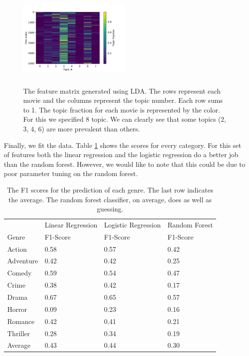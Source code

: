 \documentclass[11pt]{article}
\begin{document}
\begin{figure}[ht]
	\centering
		\includegraphics[width=0.5\textwidth,height=5cm]{lda_features.pdf}
	\caption{The feature matrix generated using LDA. The rows represent each movie and the columns represent the topic number. Each row sums to 1. The topic fraction for each movie is represented by the color. For this we specified 8 topic. We can clearly see that some topics (2, 3, 4, 6) are more prevalent than others.}
	\label{fig:lda}
\end{figure}

Finally, we fit the data. Table \ref{tab:lda_scores} shows the scores for every category. For this set of features both the linear regression and the logistic regression do a better job than the random forest. However, we would like to note that this could be due to poor parameter tuning on the random forest.

\begin{table}[h]
	\label{tab:lda_scores}
\begin{center}
	\begin{tabular}{| l | l | l | l |}
		\hline
		           & Linear Regression & Logistic Regression & Random Forest \\
		Genre      & F1-Score          & F1-Score            & F1-Score       \\
	  	\hline			
	  	Action     & 0.58              & 0.57                & 0.42 \\
	  	Adventure  & 0.42              & 0.42                & 0.25 \\ 
	  	Comedy     & 0.59              & 0.54                & 0.47 \\
	  	Crime      & 0.38              & 0.42                & 0.17 \\
	  	Drama      & 0.67              & 0.65                & 0.57 \\
	  	Horror     & 0.09              & 0.23                & 0.16 \\
	  	Romance    & 0.42              & 0.41                & 0.21 \\
	  	Thriller   & 0.28              & 0.34                & 0.19 \\
	  	\hline
	  	Average    & 0.43              & 0.44                & 0.30 \\
	  \hline  
	\end{tabular}
\end{center}
	\caption{The F1 scores for the prediction of each genre. The last row indicates the average. The random forest classifier, on average, does as well as guessing.}
\end{table}
\end{document}
